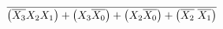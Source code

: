 \documentclass[preview]{standalone}
\begin{document}
\begin{align*}
\overline{\left(\overline{X_3}X_2X_1\right)+\left(X_3\overline{X_0}\right)+\left(X_2\overline{X_0}\right)+\left(\overline{X_2}\hspace{0.1cm}\overline{X_1}\right)}
\end{align*}
\end{document}
